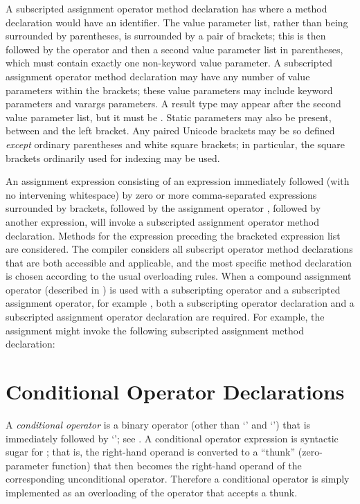 A subscripted assignment operator method declaration has
 where a method declaration would have an identifier.  The value
parameter list, rather than being surrounded by parentheses, is
surrounded by a pair of brackets; this is then followed by the
operator \txt{:=} and then a second value parameter list in parentheses,
which must contain exactly one non-keyword
value parameter.  A subscripted
assignment operator method declaration may have any number of value
parameters within the brackets; these value parameters may include
keyword parameters and
varargs parameters.  A result type
may appear after the second value parameter list, but it must be \TYP{()}.
Static parameters may also be present, between 
and the left bracket.  Any paired Unicode brackets may be so
defined \emph{except} ordinary parentheses and white square brackets; in
particular, the square brackets ordinarily used for indexing may
be used.

An assignment expression consisting of an expression immediately
followed (with no intervening whitespace) by zero or more
comma-separated expressions surrounded by brackets, followed by the
assignment operator \txt{:=}, followed by another expression, will
invoke a subscripted assignment operator method declaration.  Methods
for the expression preceding the bracketed expression list are
considered.  The compiler considers all subscript operator method
declarations that are both accessible and applicable, and the most
specific method declaration is chosen according to the usual overloading
rules.  When a compound assignment operator (described in
) is used with a subscripting operator and
a subscripted assignment operator, for example ,
both a subscripting operator declaration and a subscripted assignment
operator declaration are required.
For example, the assignment  might
invoke the following subscripted assignment method declaration:





\section{Conditional Operator Declarations}

A \emph{conditional operator} is a binary operator (other than `\txt{:}' and
`\txt{::}') that
is immediately followed by `\txt{:}'; see .
A conditional operator expression  is syntactic sugar for
; that is, the right-hand operand
is converted to a ``thunk''
(zero-parameter function) that then becomes the right-hand operand of the
corresponding unconditional operator.  Therefore a conditional
operator is simply implemented as an overloading of the operator that
accepts a thunk.



